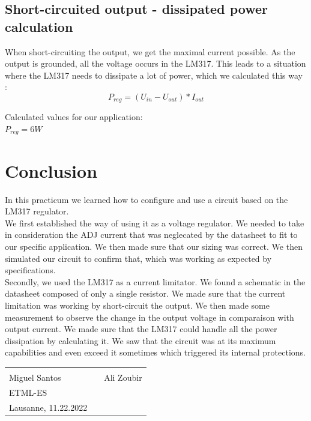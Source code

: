 \subsection{Short-circuited output - dissipated power calculation} \label{ssec:num16}
{
	When short-circuiting the output, we get the maximal current possible. As the output is grounded, all the voltage occurs in the LM317. This leads to a situation where the LM317 needs to dissipate a lot of power, which we calculated this way : \\
	
	\begin{equation}
		P_{reg} = (U_{in} - U_{out} ) * I_{out}
	\end{equation}

	Calculated values for our application:\\
	
	$ P_{reg} = 6W $ \\
}

\clearpage
\section{Conclusion}
{
	In this practicum we learned how to configure and use a circuit based on the LM317 regulator. \\
	We first established the way of using it as a voltage regulator. We needed to take in consideration the ADJ current that was neglecated by the datasheet to fit to our specific application. We then made sure that our sizing was correct. We then simulated our circuit to confirm that, which was working as expected by specifications.\\
	Secondly, we used the LM317 as a current limitator. We found a schematic in the datasheet composed of only a single resistor. We made sure that the current limitation was working by short-circuit the output. We then made some measurement to observe the change in the output voltage in comparaison with output current. We made sure that the LM317 could handle all the power dissipation by calculating it. We saw that the circuit was at its maximum capabilities and even exceed it sometimes which triggered its internal protections.\\
	
	\vspace{90mm}
	\begin{tabular}{@{}p{2.5in}p{2in}p{2in}@{}}
		
		\hrulefill && \hrulefill\\
		Miguel Santos && Ali Zoubir\\
		ETML-ES \\
		Lausanne, 11.22.2022 \\
	\end{tabular}
}

\clearpage
